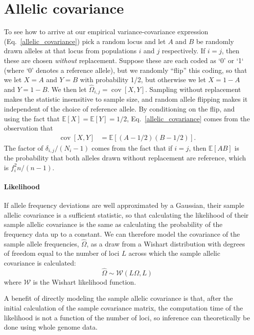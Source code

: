 \documentclass[10pt,letterpaper]{article}
\newcommand{\E}{\mathbb{E}}
\newcommand{\cov}{\mathop{\mbox{cov}}}
\begin{document}
\section*{Allelic covariance}\label{allelic_cov}
To see how to arrive at our empirical variance-covariance expression (Eq.\ \eqref{allelic_covariance})
pick a random locus and
let $A$ and $B$ be randomly drawn alleles at that locus from populations $i$ and $j$ respectively.
If $i=j$, then these are chosen \emph{without} replacement.
Suppose these are each coded as `0' or `1` (where `0' denotes a reference allele),
but we randomly ``flip'' this coding, so that we let $X=A$ and $Y=B$ with probability 1/2,
but otherwise we let $X=1-A$ and $Y=1-B$.
We then let $\widehat{\Omega}_{i,j} = \cov[X,Y]$. 
Sampling without replacement makes the statistic insensitive to sample size,
and random allele flipping makes it independent of the choice of reference allele.
By conditioning on the flip,
and using the fact that $\E[X] = \E[Y] = 1/2$,
Eq.\ \eqref{allelic_covariance} comes from the observation that
\begin{align} \label{eqn:cov_xy}
\cov[X,Y] %
    &= \E[(A-1/2)(B-1/2)] .
\end{align}
The factor of $\delta_{i,j}/(N_i-1)$ comes from the fact that if $i=j$,
then $\E[AB]$ is the probability that both alleles drawn without replacement are reference,
which is $f_i^2 n/(n-1)$.

\paragraph{Likelihood}
If allele frequency deviations are well approximated by a Gaussian, 
their sample allelic covariance is a sufficient statistic,
so that calculating the likelihood of their sample allelic covariance is the same as 
calculating the probability of the frequency data up to a constant. 
We can therefore model the covariance of the sample allele frequencies, $\widehat{\Omega}$, 
as a draw from a Wishart distribution with degrees of freedom equal to 
the number of loci $L$ across which the sample allelic covariance is calculated:
\begin{equation}
\widehat{\Omega} \sim \mathcal{W}\left( L\Omega, L	\right) 
\label{wishart}
\end{equation}
where $\mathcal{W}$ is the Wishart likelihood function.

A benefit of directly modeling the sample allelic covariance is that, 
after the initial calculation of the sample covariance matrix,
the computation time of the likelihood is not a function of the number of loci,
so inference can theoretically be done using whole genome data.
\end{document}
